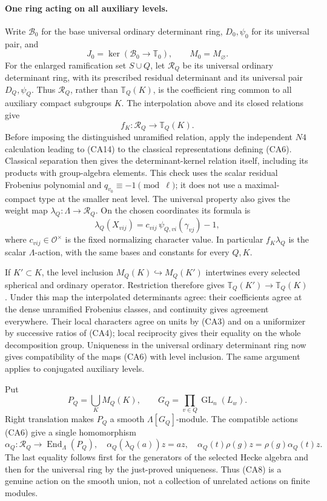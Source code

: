 \paragraph{One ring acting on all auxiliary levels.}
Write \(\mathcal B_0\) for the base universal ordinary
determinant ring, \(D_0,\psi_0\) for its universal pair,
and
\[
 J_0=\ker(\mathcal B_0\longrightarrow\mathbb T_0),
 \qquad
 M_0=M_{\varnothing}.
\]
For the enlarged ramification set \(S\cup Q\), let
\(\mathcal R_Q\) be its universal ordinary determinant
ring, with its prescribed residual determinant and its
universal pair \(D_Q,\psi_Q\).
Thus \(\mathcal R_Q\), rather than
\(\mathbb T_Q(K)\), is the coefficient ring common to
all auxiliary compact subgroups \(K\).
The interpolation above and its closed relations give
\[
 f_K:\mathcal R_Q\longrightarrow\mathbb T_Q(K).
                                                               \tag{CA6}
\]
Before imposing the distinguished unramified relation,
apply the independent \(N4\) calculation leading to
(CA14) to the classical representations defining (CA6).
Classical separation then gives the determinant-kernel
relation itself, including its products with group-algebra
elements. This check uses the scalar residual
Frobenius polynomial and \(q_{v_0}\equiv-1\pmod\ell\);
it does not use a maximal-compact type at the smaller
neat level.
The universal property also gives the weight map
\(\lambda_Q:\Lambda\to\mathcal R_Q\). On the chosen
coordinates its formula is
\[
 \lambda_Q(X_{vij})=
       c_{vij}\,\psi_{Q,vi}(\gamma_{vj})-1,                 \tag{CA7}
\]
where \(c_{vij}\in\mathcal O^\times\) is the fixed
normalizing character value. In particular
\(f_K\lambda_Q\) is the scalar \(\Lambda\)-action, with
the same bases and constants for every \(Q,K\).

If \(K'\subset K\), the level inclusion
\(M_Q(K)\hookrightarrow M_Q(K')\) intertwines every
selected spherical and ordinary operator.
Restriction therefore gives
\(\mathbb T_Q(K')\to\mathbb T_Q(K)\).
Under this map the interpolated determinants agree:
their coefficients agree at the dense unramified
Frobenius classes, and continuity gives agreement
everywhere. Their local characters agree on units by
(CA3) and on a uniformizer by successive ratios of
(CA4); local reciprocity gives their equality on the
whole decomposition group. Uniqueness in the universal
ordinary determinant ring now gives compatibility of
the maps (CA6) with level inclusion.
The same argument applies to conjugated auxiliary levels.

Put
\[
 P_Q=\bigcup_K M_Q(K),\qquad
 G_Q=\prod_{v\in Q}\operatorname{GL}_n(L_w).
\]
Right translation makes \(P_Q\) a smooth
\(\Lambda[G_Q]\)-module. The compatible actions (CA6)
give a single homomorphism
\[
 \alpha_Q:\mathcal R_Q\longrightarrow
                  \operatorname{End}_\Lambda(P_Q),
 \quad
 \alpha_Q(\lambda_Q(a))z=az,\quad
 \alpha_Q(t)\rho(g)z=\rho(g)\alpha_Q(t)z .                 \tag{CA8}
\]
The last equality follows first for the generators of the
selected Hecke algebra and then for the universal ring
by the just-proved uniqueness. Thus (CA8) is a genuine
action on the smooth union, not a collection of unrelated
actions on finite modules.

